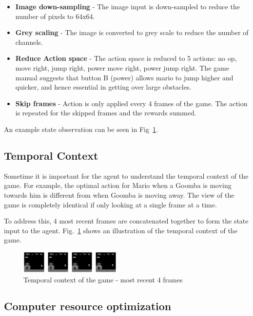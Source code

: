 \documentclass[conference]{IEEEtran}
\begin{document}
\begin{itemize}
    \item \textbf{Image down-sampling} - The image input is down-sampled to reduce the number of pixels to 64x64.
    \item \textbf{Grey scaling} - The image is converted to grey scale to reduce the number of channels.
    \item \textbf{Reduce Action space} - The action space is reduced to 5 actions: no op, move right, jump right,  power move right, power jump right. The game manual suggests that button B (power) allows mario to jump higher and quicker, and hence essential in getting over large obstacles.
    \item \textbf{Skip frames} - Action is only applied every 4 frames of the game. The action is repeated for the skipped frames and the rewards summed.
\end{itemize}

An example state observation can be seen in Fig~\ref{fig:temporal_context}.

\subsection{Temporal Context}

Sometime it is important for the agent to understand the temporal context of the game. For example, the optimal action for Mario when a Goomba is moving towards him is different from when Goomba is moving away. The view of the game is completely identical if only looking at a single frame at a time.

To address this, 4 most recent frames are concatenated together to form the state input to the agent. Fig.~\ref{fig:temporal_context} shows an illustration of the temporal context of the game.

\begin{figure}
    \centering
    \includegraphics[width=0.45\textwidth]{temporal_context_mario.png}
    \caption{Temporal context of the game - most recent 4 frames}
    \label{fig:temporal_context}
\end{figure}

\subsection{Computer resource optimization}
\end{document}
